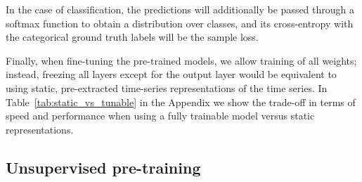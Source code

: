 \documentclass{article} \usepackage{iclr2021_conference,times}
\begin{document}
In the case of classification, the predictions  will additionally be passed through a softmax function to obtain a distribution over classes, and its cross-entropy with the categorical ground truth labels will be the sample loss.

Finally, when fine-tuning the pre-trained models, we allow training of all weights; instead, freezing all layers except for the output layer would be equivalent to using static, pre-extracted time-series representations of the time series. In Table~\ref{tab:static_vs_tunable} in the Appendix we show the trade-off in terms of speed and performance when using a fully trainable model versus static representations.

\subsection{Unsupervised pre-training} \label{sec:unsupervised_pretraining}
	
\end{document}
